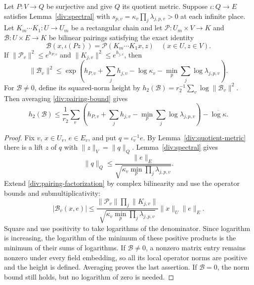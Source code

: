 \begin{proposition}\label{div:pairing-height}
Let $P:V\to Q$ be surjective and give $Q$ its quotient metric. Suppose
$\iota:Q\to E$ satisfies Lemma~\ref{div:spectral} with
$s_{p,v}=\kappa_v\prod_j\lambda_{j,p,v}>0$ at each infinite place.
Let $K_m\cdots K_1:U\to U_m$ be a rectangular chain and let
$\mathcal P:U_m\times V\to K$ and $\mathcal B:U\times E\to K$
be bilinear pairings satisfying the exact identity
\begin{equation}\label{div:pairing-factorization}
 \mathcal B(x,\iota(Pz))
       =\mathcal P(K_m\cdots K_1x,z)
                         \quad(x\in U,z\in V).
\end{equation}
If $\|\mathcal P_v\|^2\le e^{h_{P,v}}$ and
$\|K_{j,v}\|^2\le e^{h_{j,v}}$, then
\begin{equation}\label{div:pairing-bound}
 \|\mathcal B_v\|^2
 \le\exp\left(h_{P,v}+\sum_jh_{j,v}
            -\log\kappa_v-\min_p\sum_j\log\lambda_{j,p,v}\right).
\end{equation}
For $\mathcal B\ne0$, define its squared-norm height by
$h_2(\mathcal B)=r_2^{-1}\sum_v\log\|\mathcal B_v\|^2$.
Then averaging \eqref{div:pairing-bound} gives
\[
 h_2(\mathcal B)\le\frac1{r_2}\sum_v
       \left(h_{P,v}+\sum_jh_{j,v}
                   -\min_p\sum_j\log\lambda_{j,p,v}\right)
       -\overline{\log\kappa}.
\]
\end{proposition}
\begin{proof}
Fix $v$, $x\in U_v$, $e\in E_v$, and put $q=\iota_v^{-1}e$.
By Lemma~\ref{div:quotient-metric} there is a lift $z$ of $q$ with
$\|z\|_V=\|q\|_Q$. Lemma~\ref{div:spectral} gives
\[
 \|q\|_Q\le\frac{\|e\|_E}
           {\sqrt{\kappa_v\min_p\prod_j\lambda_{j,p,v}}}.
\]
Extend \eqref{div:pairing-factorization} by complex bilinearity and
use the operator bounds and submultiplicativity:
\[
 |\mathcal B_v(x,e)|
 \le\frac{\|\mathcal P_v\|\prod_j\|K_{j,v}\|}
           {\sqrt{\kappa_v\min_p\prod_j\lambda_{j,p,v}}}
          \|x\|_U\|e\|_E.
\]
Square and use positivity to take logarithms of the denominator.
Since logarithm is increasing, the logarithm of the minimum of these
positive products is the minimum of their sums of logarithms.
If $\mathcal B\ne0$, a nonzero matrix entry remains nonzero under every
field embedding, so all its local operator norms are positive and the
height is defined. Averaging proves the last assertion. If
$\mathcal B=0$, the norm bound still holds, but no logarithm of zero is
needed.
\end{proof}


